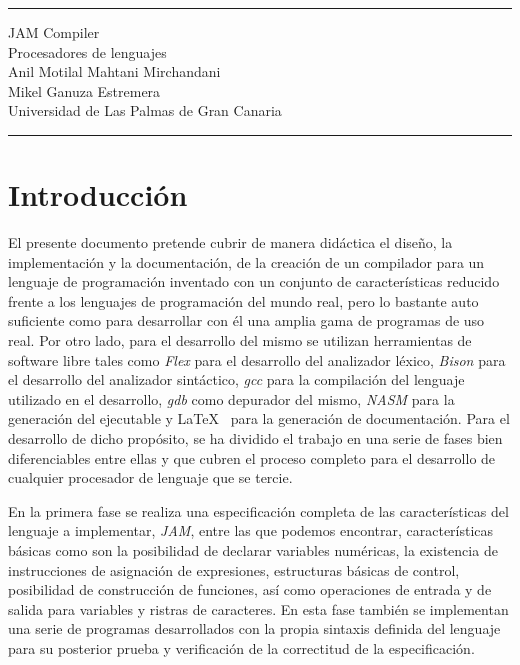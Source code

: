 \documentclass[a4paper,10pt]{article}
\begin{document}
\noindent \rule{\textwidth}{1px}
\vspace{-15px}
\begin{center}
{\ttfamily \Huge  JAM Compiler}\\[1px]
{\ttfamily \large Procesadores de lenguajes}\\[1px]
{\ttfamily \large Anil Motilal Mahtani Mirchandani}\\[1px]
{\ttfamily \large Mikel Ganuza Estremera}\\[1px]
{\ttfamily \large Universidad de Las Palmas de Gran Canaria}\\[-20px]
 \end{center}
\vspace{-12px}
\noindent \rule{\textwidth}{1px}
\vspace{-25px}
\renewcommand\contentsname{Indice de contenidos} 
\begin{spacing}{0.88}
	\tableofcontents
\end{spacing}

\newpage

\section{Introducción}
El presente documento pretende cubrir de manera didáctica el diseño, la implementación y la documentación, de la creación de un compilador para un lenguaje de programación inventado con un conjunto de características reducido frente a los lenguajes de programación del mundo real, pero lo bastante auto suficiente como para desarrollar con él una amplia gama de programas de uso real. Por otro lado, para el desarrollo del mismo se utilizan herramientas de software libre tales como \textit{Flex} para el desarrollo del analizador léxico, \textit{Bison} para el desarrollo del analizador sintáctico, \textit{gcc} para la compilación del lenguaje utilizado en el desarrollo, \textit{gdb} como depurador del mismo, \textit{NASM} para la generación del ejecutable y \LaTeX ~ para la generación de documentación.
Para el desarrollo de dicho propósito, se ha dividido el trabajo en una serie de fases bien diferenciables entre ellas y que cubren el proceso completo para el desarrollo de cualquier procesador de lenguaje que se tercie.

En la primera fase se realiza una especificación completa de las características del lenguaje a implementar, \textit{JAM},  entre las que podemos encontrar, características básicas como son la posibilidad de declarar variables numéricas, la existencia de instrucciones de asignación de expresiones, estructuras básicas de control, posibilidad de construcción de funciones, así como operaciones de entrada y de salida para variables y ristras de caracteres. En esta fase también se implementan una serie de programas desarrollados con la propia sintaxis definida del lenguaje para su posterior prueba y verificación de la correctitud de la especificación.
\end{document}
